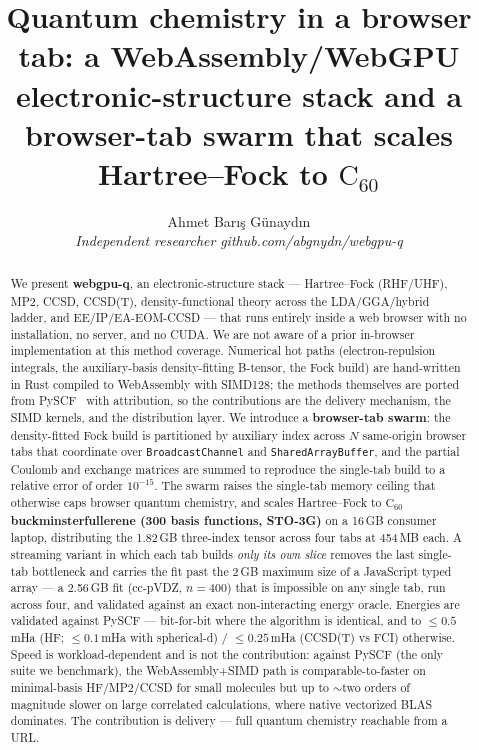 \documentclass[11pt]{article}
\title{Quantum chemistry in a browser tab: a WebAssembly/WebGPU
electronic-structure stack and a browser-tab swarm that scales
Hartree--Fock to \texorpdfstring{$\mathrm{C}_{60}$}{C60}}
\author{Ahmet Bar\i{}\c{s} G\"unayd\i{}n\\
\small\textit{Independent researcher\,\textperiodcentered\,github.com/abgnydn/webgpu-q}}
\date{}
\newcommand{\Csixty}{\ensuremath{\mathrm{C}_{60}}}
\begin{document}
\maketitle

\begin{abstract}
We present \textbf{webgpu-q}, an electronic-structure stack --- Hartree--Fock
(RHF/UHF), MP2, CCSD, CCSD(T), density-functional theory across the
LDA/GGA/hybrid ladder, and EE/IP/EA-EOM-CCSD --- that runs entirely inside a
web browser with no installation, no server, and no CUDA. We are not aware of
a prior in-browser implementation at this method coverage. Numerical hot paths
(electron-repulsion integrals, the auxiliary-basis density-fitting B-tensor,
the Fock build) are hand-written in Rust compiled to WebAssembly with SIMD128;
the methods themselves are ported from PySCF~\cite{pyscf} with attribution, so
the contributions are the delivery mechanism, the SIMD kernels, and the
distribution layer. We introduce a \textbf{browser-tab swarm}: the
density-fitted Fock build is partitioned by auxiliary index across $N$
same-origin browser tabs that coordinate over \texttt{BroadcastChannel} and
\texttt{SharedArrayBuffer}, and the partial Coulomb and exchange matrices are
summed to reproduce the single-tab build to a relative error of order
$10^{-15}$. The swarm raises the single-tab memory ceiling that otherwise caps
browser quantum chemistry, and scales Hartree--Fock to \textbf{\Csixty{}
buckminsterfullerene (300 basis functions, STO-3G)} on a 16\,GB consumer
laptop, distributing the 1.82\,GB three-index tensor across four tabs at
454\,MB each. A streaming variant in which each tab builds \emph{only its own
slice} removes the last single-tab bottleneck and carries the fit past the
2\,GB maximum size of a JavaScript typed array --- a 2.56\,GB fit (cc-pVDZ,
$n{=}400$) that is impossible on any single tab, run across four, and validated
against an exact non-interacting energy oracle. Energies are validated against
PySCF --- bit-for-bit where the
algorithm is identical, and to $\le 0.5$\,mHa (HF; $\le 0.1$\,mHa with
spherical-d) / $\le 0.25$\,mHa (CCSD(T) vs FCI) otherwise. Speed is workload-dependent and is not the
contribution: against PySCF (the only suite we benchmark), the WebAssembly+SIMD
path is comparable-to-faster on minimal-basis HF/MP2/CCSD for small molecules
but up to $\sim$two orders of magnitude slower on large correlated calculations,
where native vectorized BLAS dominates. The contribution is delivery --- full
quantum chemistry reachable from a URL.
\end{abstract}
\end{document}
